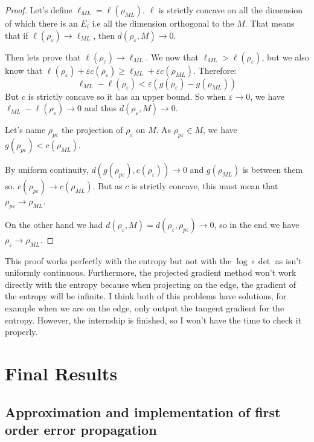 \documentclass[10pt,a4paper]{report}
\theoremstyle{plain}
\theoremstyle{definition}
\theoremstyle{remark}
\renewcommand{\geq}{\geqslant}
\newcommand{\ml}{_{M\!L}}
\begin{document}
\begin{proof}
  Let's define $\ell\ml = \ell(\rho\ml)$.
  $\ell$ is strictly concave on all the dimension of which there is an $E_i$
  i.e all the dimension orthogonal to the $M$. That means that if
  $\ell(\rho_\varepsilon) \to \ell\ml$, then $d(\rho_\varepsilon,M) \to 0$.

  Then lets prove that $\ell(\rho_\varepsilon) \to \ell\ml$. We now that
  $\ell\ml > \ell(\rho_\varepsilon)$, but we also know that
  $\ell(\rho_\varepsilon) + \varepsilon c(\rho_\varepsilon) \geq \ell\ml +
  \varepsilon c(\rho\ml)$. Therefore:
  \[\ell\ml - \ell(\rho_\varepsilon) < \varepsilon (g(\rho_\varepsilon) - g(\rho\ml))\]
  But $c$ is strictly concave so it has an upper bound. So when $\varepsilon \to
  0$, we have $\ell\ml - \ell(\rho_\varepsilon) \to 0$ and thus
  $d(\rho_\varepsilon,M)\to 0$.

  Let's name $\rho_{p\varepsilon}$ the projection of $\rho_\varepsilon$ on $M$.
  As $\rho_{p\varepsilon} \in M$, we have $g(\rho_{p\varepsilon}) < c(\rho\ml)$.

  By uniform continuity, $d(g(\rho_{p\varepsilon}),c(\rho_\varepsilon)) \to 0$
  and $g(\rho\ml)$ is between them so. $c(\rho_{p\varepsilon}) \to c(\rho\ml)$.
  But as $c$ is strictly concave, this must mean that $\rho_{p\varepsilon} \to
  \rho\ml$.

  On the other hand we had $d(\rho_\varepsilon,M) =
  d(\rho_\varepsilon,\rho_{p\varepsilon}) \to 0$, so in the end we have
  $\rho_\varepsilon \to \rho\ml$.
\end{proof}

This proof works perfectly with the entropy but not with the $\log \circ \det$
as isn't uniformly continuous. Furthermore, the projected gradient method won't
work directly with the entropy because when projecting on the edge, the gradient of the
entropy will be infinite. I think both of this problems have solutions, for
example when we are on the edge, only output the tangent gradient for the
entropy. However, the internship is finished, so I won't have the time to check
it properly.


\chapter{Final Results}

\section{Approximation and implementation of first order error propagation}
\end{document}

